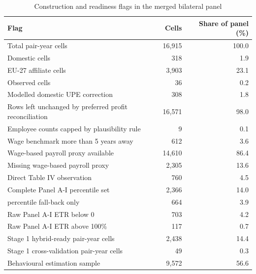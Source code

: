 \begin{table}[H]
\centering
\caption{Construction and readiness flags in the merged bilateral panel}
\label{tab:base_panel_flags_working}
\small
\begin{tabular}{@{}L{7.6cm}rr@{}}
\toprule
Flag & Cells & Share of panel (\%) \\
\midrule
Total pair-year cells & 16,915 & 100.0 \\
Domestic cells & 318 & 1.9 \\
EU-27 affiliate cells & 3,903 & 23.1 \\
Observed  cells & 36 & 0.2 \\
Modelled domestic UPE correction & 308 & 1.8 \\
Rows left unchanged by preferred profit reconciliation & 16,571 & 98.0 \\
Employee counts capped by plausibility rule & 9 & 0.1 \\
Wage benchmark more than 5 years away & 612 & 3.6 \\
Wage-based payroll proxy available & 14,610 & 86.4 \\
Missing wage-based payroll proxy & 2,305 & 13.6 \\
Direct Table IV  observation & 760 & 4.5 \\
Complete Panel A-I percentile set & 2,366 & 14.0 \\
 percentile fall-back only & 664 & 3.9 \\
Raw Panel A-I ETR below 0 & 703 & 4.2 \\
Raw Panel A-I ETR above 100\% & 117 & 0.7 \\
Stage 1 hybrid-ready pair-year cells & 2,438 & 14.4 \\
Stage 1 cross-validation pair-year cells & 49 & 0.3 \\
Behavioural estimation sample & 9,572 & 56.6 \\
\bottomrule
\end{tabular}


\end{table}
